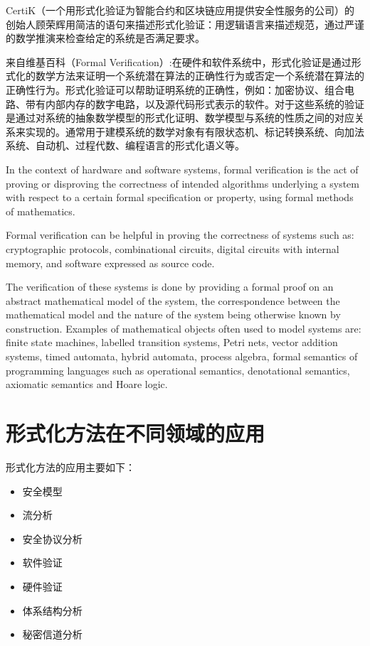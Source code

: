\documentclass[cs4size,a4pape,UTF8]{ctexart}
\numberwithin{equation}{section}
\numberwithin{table}{section}
\numberwithin{figure}{section}
\begin{document}
CertiK（一个用形式化验证为智能合约和区块链应用提供安全性服务的公司）的创始人顾荣辉用简洁的语句来描述形式化验证：用逻辑语言来描述规范，通过严谨的数学推演来检查给定的系统是否满足要求。

来自维基百科（Formal Verification）:在硬件和软件系统中，形式化验证是通过形式化的数学方法来证明一个系统潜在算法的正确性行为或否定一个系统潜在算法的正确性行为。形式化验证可以帮助证明系统的正确性，例如：加密协议、组合电路、带有内部内存的数字电路，以及源代码形式表示的软件。对于这些系统的验证是通过对系统的抽象数学模型的形式化证明、数学模型与系统的性质之间的对应关系来实现的。通常用于建模系统的数学对象有有限状态机、标记转换系统、向加法系统、自动机、过程代数、编程语言的形式化语义等。

In the context of hardware and software systems, formal verification is the act of proving or disproving the correctness of intended algorithms underlying a system with respect to a certain formal specification or property, using formal methods of mathematics.

Formal verification can be helpful in proving the correctness of systems such as: cryptographic protocols, combinational circuits, digital circuits with internal memory, and software expressed as source code.

The verification of these systems is done by providing a formal proof on an abstract mathematical model of the system, the correspondence between the mathematical model and the nature of the system being otherwise known by construction. Examples of mathematical objects often used to model systems are: finite state machines, labelled transition systems, Petri nets, vector addition systems, timed automata, hybrid automata, process algebra, formal semantics of programming languages such as operational semantics, denotational semantics, axiomatic semantics and Hoare logic\cite{formalverification}.


\section{形式化方法在不同领域的应用}
形式化方法的应用主要如下：

\begin{itemize}
\item 安全模型
\item 流分析
\item 安全协议分析
\item 软件验证
\item 硬件验证
\item 体系结构分析
\item 秘密信道分析
\end{itemize}
\end{document}
